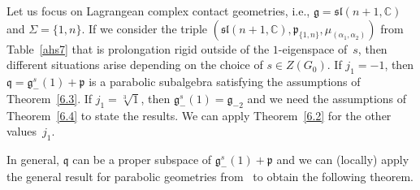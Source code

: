 \documentclass[pdftex]{sigma}
\newcommand{\fg}{\mathfrak g}
\newcommand{\fv}{\mathfrak q}
\newcommand{\fp}{\mathfrak p}
\numberwithin{equation}{section}
\begin{document}
\begin{Example}
Let us focus on Lagrangean complex contact geometries, i.e., $\fg=\mathfrak{sl}(n+1,\mathbb{C})$ and $\Sigma=\{1,n\}$. If we consider the triple $(\mathfrak{sl}(n+1,\mathbb{C}),\fp_{\{1,n\}},\mu_{(\alpha_1,\alpha_2)})$ from Table~\ref{ahs7} that is prolongation rigid outside of the $1$-eigenspace of~$s$, then dif\/ferent situations arise depending on the choice of $s\in Z(G_0)$. If $j_1=-1$, then $\fv=\fg_{-}^s(1)+\fp$ is a parabolic subalgebra satisfying the assumptions of Theorem~\ref{6.3}. If $j_1=\sqrt[3]{1}$, then $\fg_{-}^s(1)=\fg_{-2}$ and we need the assumptions of Theorem~\ref{6.4} to state the results. We can apply Theorem~\ref{6.2} for the other values~$j_1$.
\end{Example}

In general, $\fv$ can be a proper subspace of $\fg_{-}^s(1)+\fp$ and we can (locally) apply the general result for parabolic geometries from~\cite{cap-cor} to obtain the following theorem.
\end{document}
